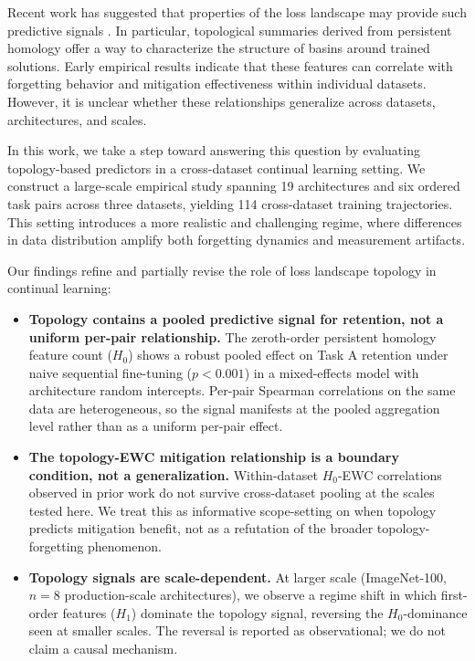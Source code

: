 \documentclass[10pt,twocolumn]{article}
\begin{document}
Recent work has suggested that properties of the loss landscape may provide such predictive signals \citep{li2018visualizing, keskar2017on, garipov2018loss}. In particular, topological summaries derived from persistent homology \citep{carlsson2009topology} offer a way to characterize the structure of basins around trained solutions. Early empirical results indicate that these features can correlate with forgetting behavior and mitigation effectiveness within individual datasets. However, it is unclear whether these relationships generalize across datasets, architectures, and scales.

In this work, we take a step toward answering this question by evaluating topology-based predictors in a cross-dataset continual learning setting. We construct a large-scale empirical study spanning 19 architectures and six ordered task pairs across three datasets, yielding 114 cross-dataset training trajectories. This setting introduces a more realistic and challenging regime, where differences in data distribution amplify both forgetting dynamics and measurement artifacts.

Our findings refine and partially revise the role of loss landscape topology in continual learning:

\begin{itemize}
    \item \textbf{Topology contains a pooled predictive signal for retention, not a uniform per-pair relationship.} The zeroth-order persistent homology feature count ($H_0$) shows a robust pooled effect on Task A retention under naive sequential fine-tuning ($p < 0.001$) in a mixed-effects model with architecture random intercepts. Per-pair Spearman correlations on the same data are heterogeneous, so the signal manifests at the pooled aggregation level rather than as a uniform per-pair effect.
    \item \textbf{The topology-EWC mitigation relationship is a boundary condition, not a generalization.} Within-dataset $H_0$-EWC correlations observed in prior work do not survive cross-dataset pooling at the scales tested here. We treat this as informative scope-setting on when topology predicts mitigation benefit, not as a refutation of the broader topology-forgetting phenomenon.
    \item \textbf{Topology signals are scale-dependent.} At larger scale (ImageNet-100, $n = 8$ production-scale architectures), we observe a regime shift in which first-order features ($H_1$) dominate the topology signal, reversing the $H_0$-dominance seen at smaller scales. The reversal is reported as observational; we do not claim a causal mechanism.
\end{itemize}
\end{document}
